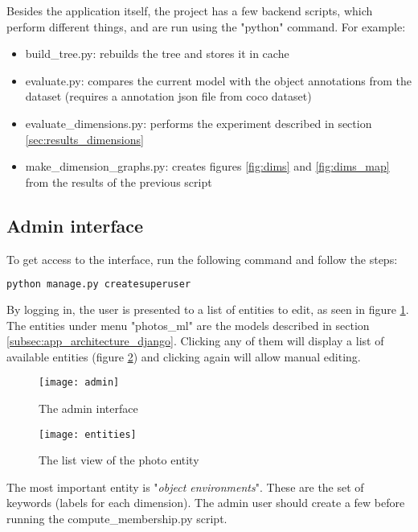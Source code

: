 Besides the application itself, the project has a few backend scripts, which perform different things, and are run using the "python" command. For example:

\begin{itemize}
\item{build\_tree.py: rebuilds the tree and stores it in cache}
\item{evaluate.py: compares the current model with the object annotations from the dataset (requires a annotation json file from coco dataset)}
\item{evaluate\_dimensions.py: performs the experiment described in section \ref{sec:results_dimensions}}
\item{make\_dimension\_graphs.py: creates figures \ref{fig:dims} and \ref{fig:dims_map} from the results of the previous script}
\end{itemize}

\subsection{Admin interface}
\label{subsec:app_usage_admin}

To get access to the interface, run the following command and follow the steps:

\begin{lstlisting}[language=Bash]
python manage.py createsuperuser
\end{lstlisting}

By logging in, the user is presented to a list of entities to edit, as seen in figure \ref{fig:admin}. The entities under menu "photos\_ml" are the models described in section \ref{subsec:app_architecture_django}. Clicking any of them will display a list of available entities (figure \ref{fig:entities}) and clicking again will allow manual editing.

\begin{figure}[b!]
\centering
\texttt{[image: admin]}
\caption{The admin interface}
\label{fig:admin}
\end{figure}

\begin{figure}[b!]
\centering
\texttt{[image: entities]}
\caption{The list view of the photo entity}
\label{fig:entities}
\end{figure}

The most important entity is "\textit{object environments}". These are the set of keywords (labels for each dimension). The admin user should create a few before running the compute\_membership.py script.

